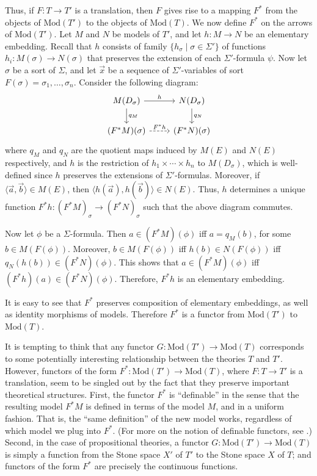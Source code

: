 Thus, if $F:T\to T'$ is a translation, then $F$ gives rise to a
mapping $F^*$ from the objects of $\mathrm{Mod}(T')$ to the objects of
$\mathrm{Mod}(T)$.  We now define $F^*$ on the arrows of
$\mathrm{Mod}(T')$.  Let $M$ and $N$ be models of $T'$, and let
$h:M\to N$ be an elementary embedding.  Recall that $h$ consists of
family $\{ h_\sigma \mid \sigma \in \Sigma '\}$ of functions
$h_i :M(\sigma )\to N(\sigma )$ that preserves the extension of each
$\Sigma '$-formula $\psi$.  Now let $\sigma$ be a sort of $\Sigma$,
and let $\vec{x}$ be a sequence of $\Sigma '$-variables of sort
$F(\sigma )=\sigma _1,\dots ,\sigma _n$.  Consider the following
diagram:
\[ \begin{tikzcd} M(D_\sigma ) \arrow{r}{h} \arrow{d}{q_M} &
    N(D_\sigma )
    \arrow{d}{q_N} \\
    (F^*M)(\sigma )\arrow[dashed]{r}{F^*h} & (F^*N)(\sigma
    ) \end{tikzcd} \] where $q_M$ and $q_N$ are the quotient maps
induced by $M(E)$ and $N(E)$ respectively, and $h$ is the restriction
of $h_1\times\cdots\times h_n$ to $M(D_\sigma )$, which is
well-defined since $h$ preserves the extensions of
$\Sigma '$-formulas.  Moreover, if
$\langle \vec{a},\vec{b}\rangle\in M(E)$, then
$\langle h(\vec{a}),h(\vec{b})\rangle \in N(E)$.  Thus, $h$ determines
a unique function $F^*h:(F^*M)_\sigma \to (F^*N)_\sigma $ such that
the above diagram commutes.

  Now let $\phi$ be a $\Sigma$-formula.  Then $a\in (F^*M)(\phi )$ iff
  $a=q_M(b)$, for some $b\in M(F(\phi ))$.  Moreover,
  $b\in M(F(\phi ))$ iff $h(b)\in N(F(\phi ))$ iff
  $q_N(h(b))\in (F^*N)(\phi )$.  This shows that $a\in (F^*M)(\phi )$
  iff $(F^*h)(a)\in (F^*N)(\phi )$.  Therefore, $F^*h$ is an
  elementary embedding.

It is easy to see that $F^*$ preserves composition of elementary
  embeddings, as well as identity morphisms of models.  Therefore
  $F^*$ is a functor from $\mathrm{Mod}(T')$ to $\mathrm{Mod}(T)$.


  \begin{disc} It is tempting to think that any functor
    $G:\mathrm{Mod}(T')\to \mathrm{Mod}(T)$ corresponds to some
    potentially interesting relationship between the theories $T$ and
    $T'$.  However, functors of the form
    $F^*:\mathrm{Mod}(T')\to\mathrm{Mod}(T)$, where $F:T\to T'$ is a
    translation, seem to be singled out by the fact that they preserve
    important theoretical structures.  First, the functor $F^*$ is
    ``definable'' in the sense that the resulting model $F^*M$ is
    defined in terms of the model $M$, and in a uniform fashion.  That
    is, the ``same definition'' of the new model works, regardless of
    which model we plug into $F^*$.  (For more on the notion of
    definable functors, see \cite{hudetz-new}.)  Second, in the case
    of propositional theories, a functor
    $G:\mathrm{Mod}(T')\to \mathrm{Mod}(T)$ is simply a function from
    the Stone space $X'$ of $T'$ to the Stone space $X$ of $T$; and
    functors of the form $F^*$ are precisely the continuous
    functions.  \end{disc}

